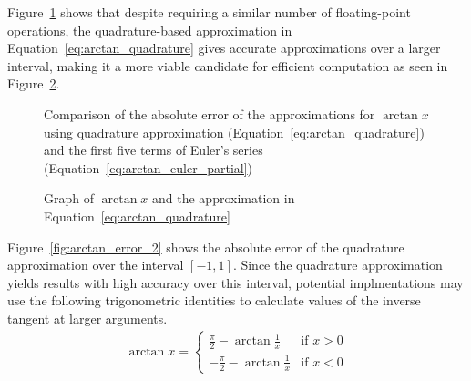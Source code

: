 Figure~\ref{fig:arctan_error} shows that despite requiring a similar number of floating-point operations, the quadrature-based approximation in Equation~\ref{eq:arctan_quadrature} gives accurate approximations over a larger interval, making it a more viable candidate for efficient computation as seen in Figure~\ref{fig:arctan_comparison}.
\begin{figure}[!ht]
	\centering
	\caption{Comparison of the absolute error of the approximations for $\arctan x$ using quadrature approximation (Equation~\ref{eq:arctan_quadrature}) and the first five terms of Euler's series (Equation~\ref{eq:arctan_euler_partial})}
	\label{fig:arctan_error}
\end{figure}

\begin{figure}[ht]
	\centering
	\caption{Graph of $\arctan x$ and the approximation in Equation~\ref{eq:arctan_quadrature}}
	\label{fig:arctan_comparison}
\end{figure}

Figure~\ref{fig:arctan_error_2} shows the absolute error of the quadrature approximation over the interval $[-1,1]$. Since the quadrature approximation yields results with high accuracy over this interval, potential implmentations may use the following trigonometric identities to calculate values of the inverse tangent at larger arguments.
\begin{align*}
	\arctan x =
	\begin{cases}
		\frac{\pi}{2}-\arctan{\frac{1}{x}} & \text{if } x > 0 \\
		-\frac{\pi}{2}-\arctan{\frac{1}{x}} & \text{if } x < 0
	\end{cases}
\end{align*}

